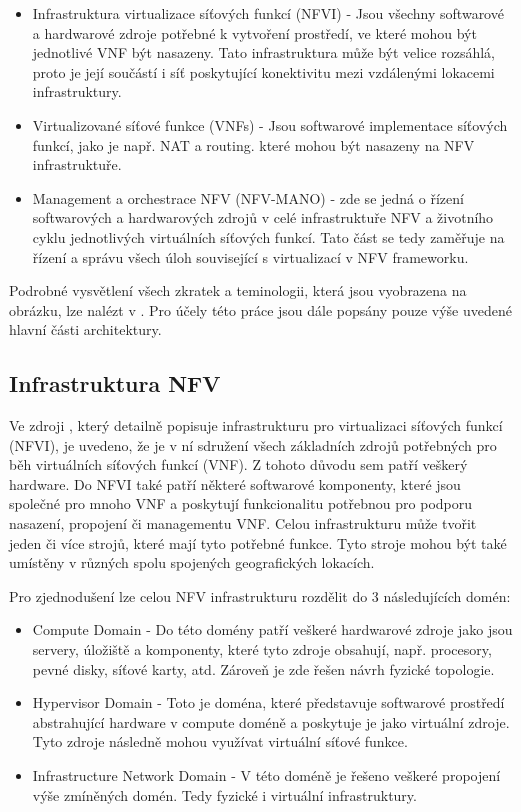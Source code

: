 \begin{itemize}
\item Infrastruktura virtualizace síťových funkcí (NFVI) - Jsou všechny softwarové a hardwarové zdroje potřebné k vytvoření prostředí, ve které mohou být jednotlivé VNF být nasazeny. Tato infrastruktura může být velice rozsáhlá, proto je její součástí i síť poskytující konektivitu mezi vzdálenými lokacemi infrastruktury.
\item Virtualizované síťové funkce (VNFs) - Jsou softwarové implementace síťových funkcí, jako je např. NAT a routing. které mohou být nasazeny na NFV infrastruktuře.
\item Management a orchestrace NFV (NFV-MANO) - zde se jedná o řízení softwarových a hardwarových zdrojů v celé infrastruktuře NFV a životního cyklu jednotlivých virtuálních síťových funkcí. Tato část se tedy zaměřuje na řízení a správu všech úloh související s virtualizací v NFV frameworku.
\end{itemize}

Podrobné vysvětlení všech zkratek a teminologii, která jsou vyobrazena na obrázku, lze nalézt v \cite{NFV_terminology}. Pro účely této práce jsou dále popsány pouze výše uvedené hlavní části architektury.

\subsection{Infrastruktura NFV}

Ve zdroji \cite{NFV_infrastructure}, který detailně popisuje infrastrukturu pro virtualizaci síťových funkcí (NFVI), je uvedeno, že je v ní sdružení všech základních zdrojů potřebných pro běh virtuálních síťových funkcí (VNF). Z tohoto důvodu sem patří veškerý hardware. Do NFVI také patří některé softwarové komponenty, které jsou společné pro mnoho VNF a poskytují funkcionalitu potřebnou pro podporu nasazení, propojení či managementu VNF. Celou infrastrukturu může tvořit jeden či více strojů, které mají tyto potřebné funkce. Tyto stroje mohou být také umístěny v různých spolu spojených geografických lokacích. 

Pro zjednodušení lze celou NFV infrastrukturu rozdělit do 3 následujících domén:

\begin{itemize}
\item Compute Domain - Do této domény patří veškeré hardwarové zdroje jako jsou servery, úložiště a komponenty, které tyto zdroje obsahují, např. procesory, pevné disky, síťové karty, atd. Zároveň je zde řešen návrh fyzické topologie. \cite{NFV_compute}
\item Hypervisor Domain - Toto je doména, které představuje softwarové prostředí abstrahující hardware v compute doméně a poskytuje je jako virtuální zdroje. Tyto zdroje následně mohou využívat virtuální síťové funkce. \cite{NFV_hypervisor}
\item Infrastructure Network Domain - V této doméně je řešeno veškeré propojení výše zmíněných domén. Tedy fyzické i virtuální infrastruktury.\cite{NFV_network}
\end{itemize}

